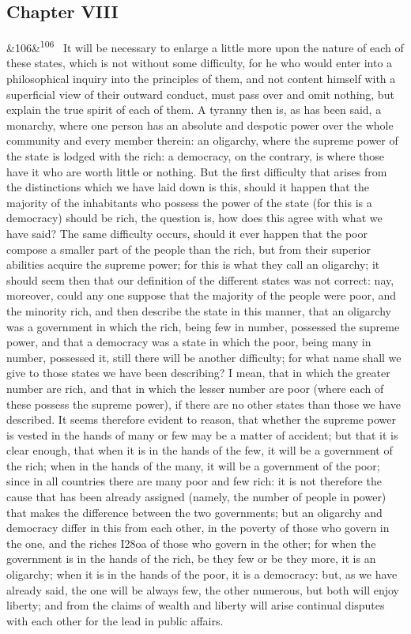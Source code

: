 \documentclass[12pt]{article}
\newcommand{\para}[1][]{\par\noindent\ifx&#1&\else\textsuperscript{\footnotesize #1}~\fi}
\begin{document}
\subsection*{Chapter VIII}

\para[106] It will be necessary to enlarge a little more upon the nature of each of these states, which is not without some difficulty, for he who would enter into a philosophical inquiry into the principles of them, and not content himself with a superficial view of their outward conduct, must pass over and omit nothing, but explain the true spirit of each of them. A tyranny then is, as has been said, a monarchy, where one person has an absolute and despotic power over the whole community and every member therein: an oligarchy, where the supreme power of the state is lodged with the rich: a democracy, on the contrary, is where those have it who are worth little or nothing. But the first difficulty that arises from the distinctions which we have laid down is this, should it happen that the majority of the inhabitants who possess the power of the state (for this is a democracy) should be rich, the question is, how does this agree with what we have said? The same difficulty occurs, should it ever happen that the poor compose a smaller part of the people than the rich, but from their superior abilities acquire the supreme power; for this is what they call an oligarchy; it should seem then that our definition of the different states was not correct: nay, moreover, could any one suppose that the majority of the people were poor, and the minority rich, and then describe the state in this manner, that an oligarchy was a government in which the rich, being few in number, possessed the supreme power, and that a democracy was a state in which the poor, being many in number, possessed it, still there will be another difficulty; for what name shall we give to those states we have been describing? I mean, that in which the greater number are rich, and that in which the lesser number are poor (where each of these possess the supreme power), if there are no other states than those we have described. It seems therefore evident to reason, that whether the supreme power is vested in the hands of many or few may be a matter of accident; but that it is clear enough, that when it is in the hands of the few, it will be a government of the rich; when in the hands of the many, it will be a government of the poor; since in all countries there are many poor and few rich: it is not therefore the cause that has been already assigned (namely, the number of people in power) that makes the difference between the two governments; but an oligarchy and democracy differ in this from each other, in the poverty of those who govern in the one, and the riches I28oa of those who govern in the other; for when the government is in the hands of the rich, be they few or be they more, it is an oligarchy; when it is in the hands of the poor, it is a democracy: but, as we have already said, the one will be always few, the other numerous, but both will enjoy liberty; and from the claims of wealth and liberty will arise continual disputes with each other for the lead in public affairs.
\end{document}
